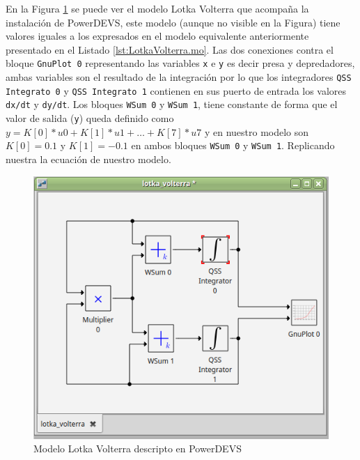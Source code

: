 	En la Figura \ref{fig:lk-powerdevs} se puede ver el modelo Lotka Volterra que acompaña la instalación de PowerDEVS, este modelo (aunque no visible en la Figura)
	tiene valores iguales a los expresados en el modelo equivalente anteriormente presentado en el Listado \ref{lst:LotkaVolterra.mo}. 
	Las dos conexiones contra el bloque \texttt{GnuPlot 0} representando las variables \texttt{x} e \texttt{y} es decir presa y depredadores, ambas variables 
	son el resultado de la integración por lo que los integradores \texttt{QSS Integrato 0} y \texttt{QSS Integrato 1} contienen en sus puerto de entrada los 
	valores \texttt{dx/dt} y \texttt{dy/dt}. 
	Los bloques \texttt{WSum 0} y \texttt{WSum 1}, tiene constante de forma que el valor de salida (\texttt{y}) queda definido como
	$y = K[0] * u0 + K[1] * u1 + \dots + K[7] * u7$ y en nuestro modelo son $K[0] = 0.1$ y $K[1] = -0.1$ en ambos bloques \texttt{WSum 0} y \texttt{WSum 1}.
	Replicando nuestra la ecuación de nuestro modelo.
	

	\begin{figure}[!htbp]
	  \includegraphics[width=\textwidth]{lk-powerdevs}
	  \caption{Modelo Lotka Volterra descripto en PowerDEVS}
	   \label{fig:lk-powerdevs}
	\end{figure}

